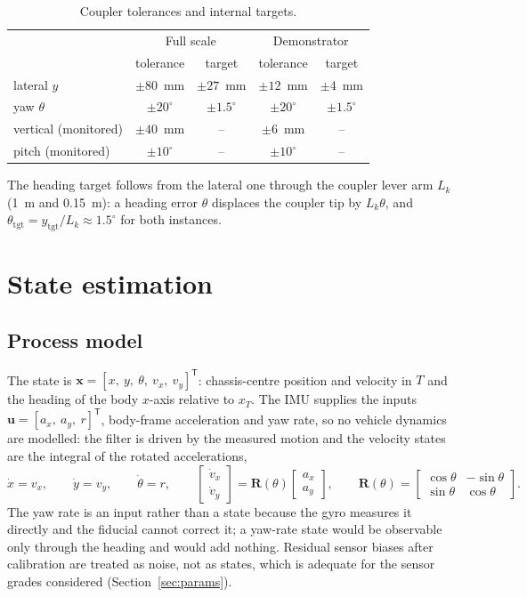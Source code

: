 \documentclass[11pt,a4paper]{article}
\newcommand{\vect}[1]{\bm{#1}}
\newcommand{\mat}[1]{\bm{#1}}
\newcommand{\T}{^{\mathsf{T}}}
\newcommand{\Rot}{\mat{R}}
\begin{document}
\begin{table}[H]
\centering\small
\caption{Coupler tolerances and internal targets.}
\label{tab:req}
\begin{tabular}{lcccc}
\toprule
 & \multicolumn{2}{c}{Full scale} & \multicolumn{2}{c}{Demonstrator} \\
 & tolerance & target & tolerance & target \\
\midrule
lateral $y$ & $\pm 80$~mm & $\pm 27$~mm & $\pm 12$~mm & $\pm 4$~mm \\
yaw $\theta$ & $\pm 20^\circ$ & $\pm 1.5^\circ$ & $\pm 20^\circ$ & $\pm 1.5^\circ$ \\
vertical (monitored) & $\pm 40$~mm & -- & $\pm 6$~mm & -- \\
pitch (monitored) & $\pm 10^\circ$ & -- & $\pm 10^\circ$ & -- \\
\bottomrule
\end{tabular}
\end{table}

The heading target follows from the lateral one through the coupler lever arm $L_k$ (1~m and 0.15~m): a heading error $\theta$ displaces the coupler tip by $L_k\theta$, and $\theta_{\mathrm{tgt}} = y_{\mathrm{tgt}}/L_k \approx 1.5^\circ$ for both instances.

\section{State estimation}
\label{sec:ekf}

\subsection{Process model}
The state is $\vect x = [x,\ y,\ \theta,\ v_x,\ v_y]\T$: chassis-centre position and velocity in $T$ and the heading of the body $x$-axis relative to $x_T$. The IMU supplies the inputs $\vect u = [a_x,\ a_y,\ r]\T$, body-frame acceleration and yaw rate, so no vehicle dynamics are modelled: the filter is driven by the measured motion and the velocity states are the integral of the rotated accelerations,
\begin{equation}
\dot x = v_x,\qquad \dot y = v_y,\qquad \dot\theta = r,\qquad
\begin{bmatrix}\dot v_x\\ \dot v_y\end{bmatrix} = \Rot(\theta)\begin{bmatrix}a_x\\ a_y\end{bmatrix},\qquad
\Rot(\theta) = \begin{bmatrix}\cos\theta & -\sin\theta\\ \sin\theta & \cos\theta\end{bmatrix}.
\label{eq:ekf-ct}
\end{equation}
The yaw rate is an input rather than a state because the gyro measures it directly and the fiducial cannot correct it; a yaw-rate state would be observable only through the heading and would add nothing. Residual sensor biases after calibration are treated as noise, not as states, which is adequate for the sensor grades considered (Section~\ref{sec:params}).
\end{document}
